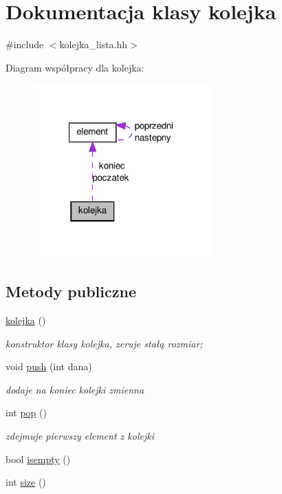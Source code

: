 \hypertarget{classkolejka}{\section{\-Dokumentacja klasy kolejka}
\label{classkolejka}
}


{\ttfamily \#include $<$kolejka\-\_\-lista.\-hh$>$}



\-Diagram współpracy dla kolejka\-:\nopagebreak
\begin{figure}[H]
\begin{center}
\leavevmode
\includegraphics[width=194pt]{classkolejka__coll__graph}
\end{center}
\end{figure}
\subsection*{\-Metody publiczne}
\begin{DoxyCompactItemize}
\item 
\hyperlink{classkolejka_ae9205d86a1f136649fac28615878729c}{kolejka} ()
\begin{DoxyCompactList}\small\item\em konstruktor klasy kolejka, zeruje stałą rozmiar; \end{DoxyCompactList}\item 
void \hyperlink{classkolejka_a090a263c1b0e37c3e447ffbf577da590}{push} (int dana)
\begin{DoxyCompactList}\small\item\em dodaje na koniec kolejki zmienna \end{DoxyCompactList}\item 
int \hyperlink{classkolejka_afdf5d84aff3c9500e696d3b6df092ace}{pop} ()
\begin{DoxyCompactList}\small\item\em zdejmuje pierwszy element z kolejki \end{DoxyCompactList}\item 
bool \hyperlink{classkolejka_adf983aef6073856cba88f5d75b9cd084}{isempty} ()
\item 
int \hyperlink{classkolejka_a74bf7134474481c349d08d0fd321390e}{size} ()
\end{DoxyCompactItemize}
